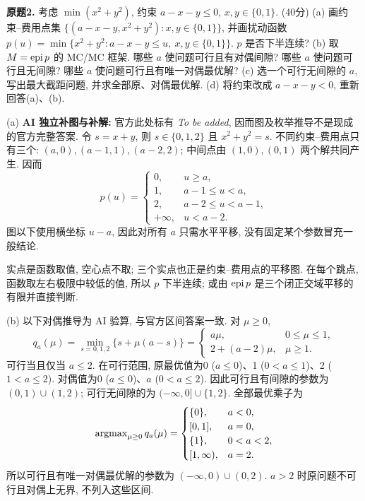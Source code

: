 \begin{exercise}\label{ass:6253-exam2012-q2}
\textbf{原题2.} 考虑 $\min(x^2+y^2)$, 约束 $a-x-y\le0$, $x,y\in\{0,1\}$. (40分)
(a) 画约束--费用点集 $\{(a-x-y,x^2+y^2):x,y\in\{0,1\}\}$, 并画扰动函数
$p(u)=\min\{x^2+y^2:a-x-y\le u,\ x,y\in\{0,1\}\}$. $p$ 是否下半连续?
(b) 取 $M=\operatorname{epi} p$ 的 MC/MC 框架. 哪些 $a$ 使问题可行且有对偶间隙? 哪些 $a$ 使问题可行且无间隙? 哪些 $a$ 使问题可行且有唯一对偶最优解?
(c) 选一个可行无间隙的 $a$, 写出最大截距问题, 并求全部原、对偶最优解.
(d) 将约束改成 $a-x-y<0$, 重新回答(a)、(b).
\end{exercise}
\begin{solution}
(a) \textbf{AI 独立补图与补解:} 官方此处标有 \emph{To be added}, 因而图及枚举推导不是现成的官方完整答案. 令 $s=x+y$, 则 $s\in\{0,1,2\}$ 且 $x^2+y^2=s$. 不同约束--费用点只有三个: $(a,0),(a-1,1),(a-2,2)$; 中间点由 $(1,0),(0,1)$ 两个解共同产生. 因而
\[
p(u)=\begin{cases}
0,&u\ge a,\\1,&a-1\le u<a,\\2,&a-2\le u<a-1,\\+\infty,&u<a-2.
\end{cases}
\]
图以下使用横坐标 $u-a$, 因此对所有 $a$ 只需水平平移, 没有固定某个参数冒充一般结论.
\begin{center}
\end{center}
实点是函数取值, 空心点不取; 三个实点也正是约束--费用点的平移图. 在每个跳点, 函数取左右极限中较低的值, 所以 $p$ 下半连续; 或由 $\operatorname{epi} p$ 是三个闭正交域平移的有限并直接判断.

(b) 以下对偶推导为 AI 验算, 与官方区间答案一致. 对 $\mu\ge0$,
\[
q_a(\mu)=\min_{s=0,1,2}\{s+\mu(a-s)\}
=\begin{cases}a\mu,&0\le\mu\le1,\\2+(a-2)\mu,&\mu\ge1.\end{cases}
\]
可行当且仅当 $a\le2$. 在可行范围, 原最优值为0 ($a\le0$)、1 ($0<a\le1$)、2 ($1<a\le2$). 对偶值为0 ($a\le0$)、$a$ ($0<a\le2$). 因此可行且有间隙的参数为 $(0,1)\cup(1,2)$; 可行无间隙的为 $(-\infty,0]\cup\{1,2\}$. 全部最优乘子为
\[
\operatorname{argmax}_{\mu\ge0}q_a(\mu)=\begin{cases}
\{0\},&a<0,\\{}[0,1],&a=0,\\\{1\},&0<a<2,\\{}[1,\infty),&a=2.
\end{cases}
\]
所以可行且有唯一对偶最优解的参数为 $(-\infty,0)\cup(0,2)$. $a>2$ 时原问题不可行且对偶上无界, 不列入这些区间.


\end{solution}
